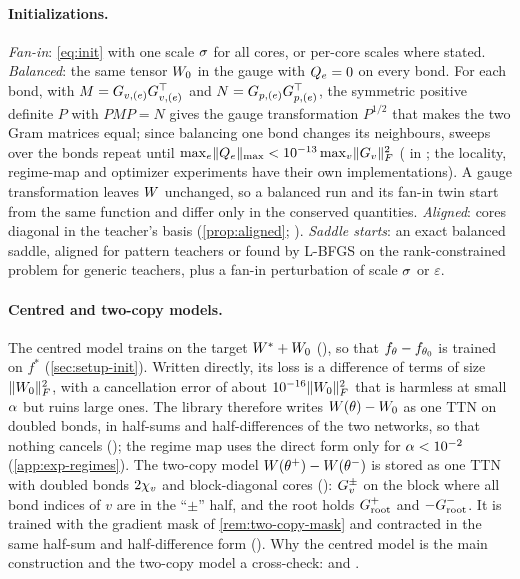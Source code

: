 \paragraph{Initializations.}
\emph{Fan-in}: \eqref{eq:init} with one scale $\sigma$ for all cores, or per-core scales where stated.
\emph{Balanced}: the same tensor $W_{0}$ in the gauge with $Q_{e}=0$ on every bond. For each bond, with
$M=G_{v,(e)}G_{v,(e)}^{\top}$ and $N=G_{p,(e)}G_{p,(e)}^{\top}$, the symmetric positive definite $P$ with $PMP=N$
gives the gauge transformation $P^{1/2}$ that makes the two Gram matrices equal; since balancing one bond
changes its neighbours, sweeps over the bonds repeat until $\max_e\lVert Q_{e}\rVert_{\max}<10^{-13}\max_v\lVert G_{v}\rVert_{F}^2$
( in ; the locality, regime-map and optimizer
experiments have their own implementations). A gauge transformation leaves $W$ unchanged, so a balanced run and its fan-in twin start
from the same function and differ only in the conserved quantities. \emph{Aligned}: cores diagonal in
the teacher's basis (\cref{prop:aligned}; ). \emph{Saddle starts}: an exact
balanced saddle, aligned for pattern teachers or found by L-BFGS on the rank-constrained problem for
generic teachers, plus a fan-in perturbation of scale $\sigma$ or $\varepsilon$.

\paragraph{Centred and two-copy models.}
The centred model trains on the target $W^{*}+W_{0}$ (), so that
$f_\theta-f_{\theta_0}$ is trained on $f^*$ (\cref{sec:setup-init}). Written directly, its loss is a
difference of terms of size $\lVert W_{0}\rVert_{F}^2$, with a cancellation error of about $10^{-16}\lVert W_{0}\rVert_{F}^2$
that is harmless at small $\alpha$ but ruins large ones. The library therefore writes $W(\theta)-W_{0}$ as
one TTN on doubled bonds, in half-sums and half-differences of the two networks, so that nothing cancels
(); the regime map uses the direct form only for $\alpha<10^{-2}$
(\cref{app:exp-regimes}). The two-copy model $W(\theta^+)-W(\theta^-)$ is stored as one TTN with doubled bonds
$2\chi_{v}$ and block-diagonal cores (): $G_{v}^\pm$ on the block where all bond
indices of $v$ are in the ``$\pm$'' half, and the root holds $G_{\mathrm{root}}^+$ and $-G_{\mathrm{root}}^-$. It is trained with the
gradient mask of \cref{rem:two-copy-mask} and contracted in the same half-sum and half-difference form
(). Why the centred model is the main construction and the two-copy
model a cross-check:  and .

